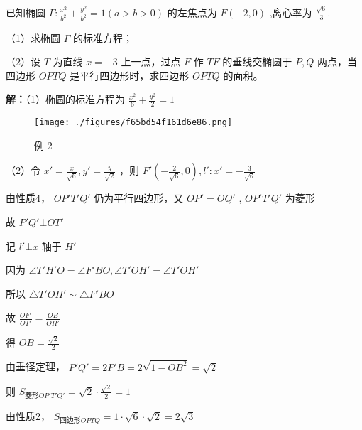 \begin{example}{}
已知椭圆 $\displaystyle{\Gamma:\frac{x^2}{b^2}+\frac{y^2}{b^2}=1(a>b>0)}$ 的左焦点为 $\displaystyle{F(-2,0)}$ ,离心率为 $\displaystyle{\frac{\sqrt{6}}{3}}$.

（1）求椭圆 $\displaystyle{\Gamma}$ 的标准方程；

（2）设 $\displaystyle{T}$ 为直线 $\displaystyle{x=-3}$ 上一点，过点 $\displaystyle{F}$ 作 $\displaystyle{TF}$ 的垂线交椭圆于 $\displaystyle{P,Q}$ 两点，当四边形 $\displaystyle{OPTQ}$ 是平行四边形时，求四边形 $\displaystyle{OPTQ}$ 的面积。

\textbf{解：}（1）椭圆的标准方程为 $\displaystyle{\frac{x^2}{6}+\frac{y^2}{2}=1}$
\begin{figure}[ht]
\centering
\texttt{[image: ./figures/f65bd54f161d6e86.png]}
\caption{例 2} \label{fig_affine_14}
\end{figure}
（2）令 $\displaystyle{x'=\frac{x}{\sqrt{6}},y'=\frac{y}{\sqrt{2}}}$ ，则 $\displaystyle{F'\left(-\frac{2}{\sqrt{6}},0\right) , l':x'=-\frac{3}{\sqrt{6}}}$

由性质4， $\displaystyle{OP'T'Q'}$ 仍为平行四边形，又 $\displaystyle{OP'=OQ'}$ , $\displaystyle{OP'T'Q'}$ 为菱形

故 $\displaystyle{P'Q'\bot OT'}$

记  $\displaystyle{l'\bot x}$ 轴于 $\displaystyle{H'}$ 

因为 $\displaystyle{\angle {T'H'O}=\angle {F'BO},\angle T'OH'=\angle T'OH'}$

所以 $\displaystyle{\triangle T'OH'\sim\triangle F'BO}$

故 $\displaystyle{\frac{OF'}{OT'}=\frac{OB}{OH'}}$

得 $\displaystyle{OB=\frac{\sqrt{2}}{2}}$

由垂径定理， $\displaystyle{P'Q'=2P'B=2\sqrt{1-OB^2}=\sqrt{2}}$

则 $\displaystyle{S_{\text{菱形}OP'T'Q'}=\sqrt{2}\cdot\frac{\sqrt{2}}{2}=1}$

由性质2， $\displaystyle{S_{\text{四边形}OPTQ}=1\cdot \sqrt{6}\cdot\sqrt{2}=2\sqrt{3}}$ 
\end{example}

